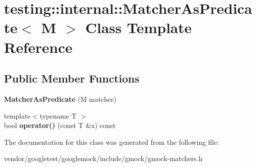 \hypertarget{classtesting_1_1internal_1_1_matcher_as_predicate}{}\section{testing\+:\+:internal\+:\+:Matcher\+As\+Predicate$<$ M $>$ Class Template Reference}
\label{classtesting_1_1internal_1_1_matcher_as_predicate}
\subsection*{Public Member Functions}
\begin{DoxyCompactItemize}
\item 
\mbox{\label{classtesting_1_1internal_1_1_matcher_as_predicate_a2d8ad258929496dd3dea00fdb8ce3c8a}} 
{\bfseries Matcher\+As\+Predicate} (M matcher)
\item 
\mbox{\label{classtesting_1_1internal_1_1_matcher_as_predicate_ab4594a16ff5cdfd07acb5017b7aa54f3}} 
{\footnotesize template$<$typename T $>$ }\\bool {\bfseries operator()} (const T \&x) const
\end{DoxyCompactItemize}


The documentation for this class was generated from the following file\+:\begin{DoxyCompactItemize}
\item 
vendor/googletest/googlemock/include/gmock/gmock-\/matchers.\+h\end{DoxyCompactItemize}

